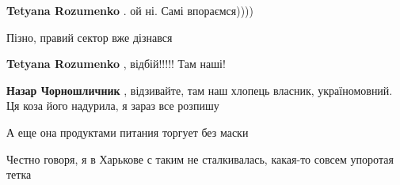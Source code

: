 \begin{itemize}
\begin{itemize}
 
\textbf{Tetyana Rozumenko} . ой ні. Самі впораємся))))

 
Пізно, правий сектор вже дізнався

 
\textbf{Tetyana Rozumenko} , відбій!!!!! Там наші!

 
\textbf{Назар Чорношличник} , відзивайте, там наш хлопець власник, україномовний. Ця коза його надурила, я зараз все розпишу
\end{itemize}

 
А еще она продуктами питания торгует без маски

 
Честно говоря, я в Харькове с таким не сталкивалась, какая-то совсем упоротая тетка

\begin{itemize}
 

\end{itemize}
\end{itemize}
